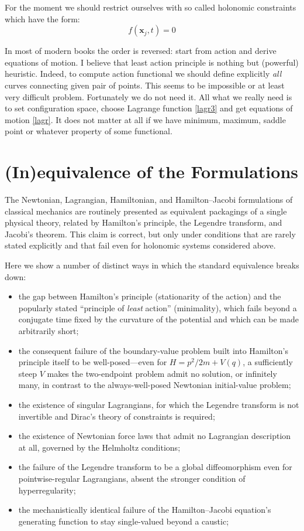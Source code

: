 For the moment we should restrict ourselves with so called holonomic
constraints which have the form:
\begin{equation}
        f(\bm x_j,t)=0 \label {hol-const}
\end{equation}


In most of modern books the order is reversed: start from action and derive
equations  of motion. I believe that least action principle  is nothing but
(powerful) heuristic. Indeed, to compute action functional we should define
explicitly {\em all} curves connecting given pair of points. This seems to be
impossible or at least very difficult problem. Fortunately we do not need it.
All what we really need is to set configuration space, choose Lagrange function
\eqref{lagr3} and get equations of motion \eqref{lagr}. It does not matter at
all if we have minimum, maximum, saddle point or whatever property of some
functional.


\section {(In)equivalence of the Formulations} 
\label{chs:nf}

The Newtonian, Lagrangian, Hamiltonian, and Hamilton--Jacobi formulations of
classical mechanics are routinely presented as equivalent packagings of a
single physical theory, related by Hamilton's principle, the Legendre
transform, and Jacobi's theorem. This claim is correct, but only under
conditions that are rarely stated explicitly and that fail even for
holonomic systems considered above.

Here we show a number  of
 distinct ways in which the standard equivalence breaks down: 
\begin{itemize}
   \item the gap
between Hamilton's principle (stationarity of the action) and the popularly
stated ``principle of \emph{least} action'' (minimality), which fails beyond a
conjugate time fixed by the curvature of the potential and which can be made
arbitrarily short;
   \item the consequent failure of the boundary-value problem built
into Hamilton's principle itself to be well-posed---even for $H=p^2/2m+V(q)$, a
sufficiently steep $V$ makes the two-endpoint problem admit no solution, or
infinitely many, in contrast to the always-well-posed Newtonian initial-value
problem;
   \item the existence of singular Lagrangians, for which the Legendre
transform is not invertible and Dirac's theory of constraints is required;
   \item the existence of Newtonian force laws that admit no
Lagrangian description at all, governed by the Helmholtz conditions;
   \item the
failure of the Legendre transform to be a global diffeomorphism even for
pointwise-regular Lagrangians, absent the stronger condition of
hyperregularity;
   \item the mechanistically identical failure of the Hamilton--Jacobi
equation's generating function to stay single-valued beyond a caustic;
\end{itemize}

